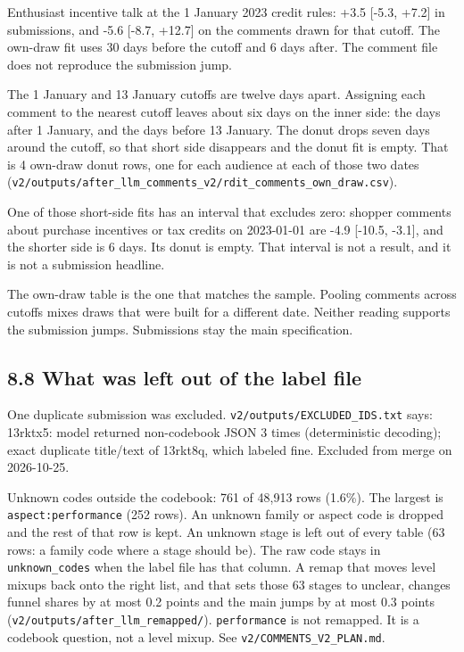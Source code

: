 \documentclass[11pt]{article}
\begin{document}
Enthusiast incentive talk at the 1 January 2023 credit rules: +3.5 [-5.3, +7.2] in submissions, and -5.6 [-8.7, +12.7] on the comments drawn for that cutoff. The own-draw fit uses 30 days before the cutoff and 6 days after. The comment file does not reproduce the submission jump.


The 1 January and 13 January cutoffs are twelve days apart. Assigning each comment to the nearest cutoff leaves about six days on the inner side: the days after 1 January, and the days before 13 January. The donut drops seven days around the cutoff, so that short side disappears and the donut fit is empty. That is 4 own-draw donut rows, one for each audience at each of those two dates (\texttt{v2/outputs/after\_llm\_comments\_v2/rdit\_comments\_own\_draw.csv}).


One of those short-side fits has an interval that excludes zero: shopper comments about purchase incentives or tax credits on 2023-01-01 are -4.9 [-10.5, -3.1], and the shorter side is 6 days. Its donut is empty. That interval is not a result, and it is not a submission headline.


The own-draw table is the one that matches the sample. Pooling comments across cutoffs mixes draws that were built for a different date. Neither reading supports the submission jumps. Submissions stay the main specification.


\subsection{8.8 What was left out of the label file}

One duplicate submission was excluded. \texttt{v2/outputs/EXCLUDED\_IDS.txt} says: 13rktx5: model returned non-codebook JSON 3 times (deterministic decoding); exact duplicate title/text of 13rkt8q, which labeled fine. Excluded from merge on 2026-10-25.


Unknown codes outside the codebook: 761 of 48,913 rows (1.6\%). The largest is \texttt{aspect:performance} (252 rows). An unknown family or aspect code is dropped and the rest of that row is kept. An unknown stage is left out of every table (63 rows: a family code where a stage should be). The raw code stays in \texttt{unknown\_codes} when the label file has that column. A remap that moves level mixups back onto the right list, and that sets those 63 stages to unclear, changes funnel shares by at most 0.2 points and the main jumps by at most 0.3 points (\texttt{v2/outputs/after\_llm\_remapped/}). \texttt{performance} is not remapped. It is a codebook question, not a level mixup. See \texttt{v2/COMMENTS\_V2\_PLAN.md}.
\end{document}
